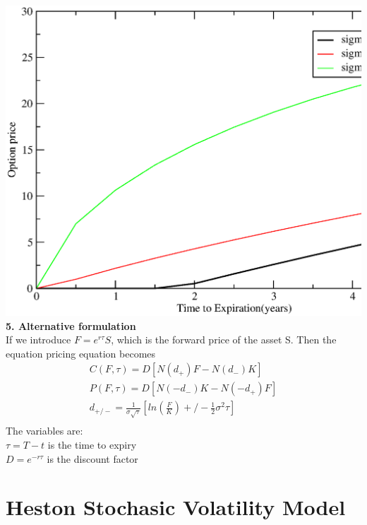\documentclass[a4paper]{article}
\begin{document}
\includegraphics[scale = 0.5]{option_price2.eps}\\
{\bf 5. Alternative formulation}\\
If we introduce $F = e^{r\tau} S$, which is the forward price of the asset S. Then the equation pricing equation becomes
\begin{align*}
	C(F,\tau)= D[N(d_+)F - N(d_-)K] \\
	P(F,\tau)= D[N(-d_-)K - N(-d_+)F] \\
	d_{+/-} = \frac{1}{\sigma \sqrt{\tau}}[ln(\frac{F}{K})+/-\frac{1}{2}\sigma^2 \tau] \\
\end{align*}
The variables are:\\
$\tau = T - t$ is the time to expiry\\
$D = e^{-r\tau}$ is the discount factor \\
\section{Heston Stochasic Volatility Model}
\end{document}

